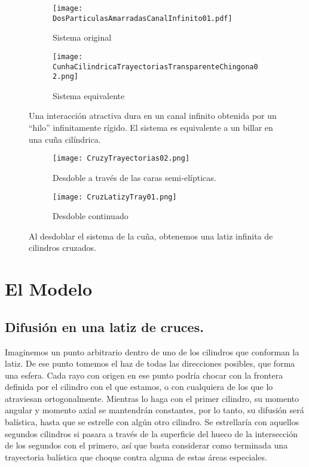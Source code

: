 \documentclass[letterpaper,12pt]{article}
\begin{document}
\begin{figure}[ht]
  \centering
  \begin{subfigure}[c]{0.5\textwidth}
    \centering
          \texttt{[image: DosParticulasAmarradasCanalInfinito01.pdf]}
                \caption{Sistema original}
                \label{particulasamarradas}
  \end{subfigure}%
\hfill
\begin{subfigure}[c]{0.4\textwidth}
    \centering
          \texttt{[image: CunhaCilindricaTrayectoriasTransparenteChingona02.png]}
          \caption{Sistema equivalente}      
          \label{cunhadeparticlas}
  \end{subfigure}%
\caption{Una interacción atractiva dura en un canal infinito obtenida por un ``hilo'' infinitamente
rígido. El sistema es equivalente a un billar en una cuña cilíndrica.}\label{cunha01}
\end{figure}


\begin{figure}[ht]
  \centering
  \begin{subfigure}[c]{0.5\textwidth}
    \centering
          \texttt{[image: CruzyTrayectorias02.png]}
                \caption{Desdoble a través de las caras semi-elípticas.}
                \label{Cruz01}
  \end{subfigure}%
\hfill
\begin{subfigure}[c]{0.4\textwidth}
    \centering
          \texttt{[image: CruzLatizyTray01.png]}
          \caption{Desdoble continuado}      
          \label{CruzLatiz}
  \end{subfigure}%
\caption{Al desdoblar el sistema de la cuña, obtenemos una latiz infinita de cilindros
cruzados.}\label{latiz01}
\end{figure}



\section{El Modelo}

\subsection{Difusión en una latiz de cruces.}

Imaginemos un punto arbitrario dentro de uno de los cilindros
que conforman la latiz. De ese punto tomemos el haz de
todas las direcciones posibles, que forma una esfera.
Cada rayo con origen en ese punto podría chocar con la
frontera definida por el cilindro con el que estamos, 
o con cualquiera de los que lo atraviesan ortogonalmente.
Mientras lo haga con el primer cilindro, su momento
angular y momento axial se mantendrán constantes,
por lo tanto, su difusión será balística, hasta que
se estrelle con algún otro cilindro. Se estrellaría con aquellos
segundos cilindros si pasara a través de la superficie del hueco
de la intersección de los segundos con el primero, así que
basta considerar como terminada una trayectoria balística
que choque contra alguna de estas áreas especiales.
\end{document}
